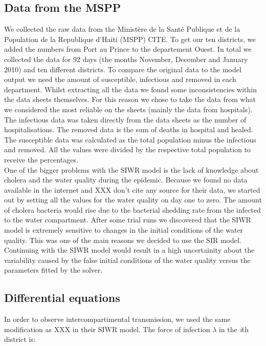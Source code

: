 \documentclass[11pt]{article}
\begin{document}
\subsection{Data from the MSPP}
We collected the raw data from the Ministère de la Santé Publique et de la Population de la Republique d'Haiti (MSPP) CITE. To get our ten districts, we added the numbers from Port au Prince to the departement Ouest. In total we collected the data for 92 days (the months November, December and January 2010) and ten different districts. To compare the original data to the model output we need the amount of susceptible, infectious and removed in each department. Whilst extracting all the data we found some inconsistencies within the data sheets themselves. For this reason we chose to take the data from what we considered the most reliable on the sheets (mainly the data from hospitals). The infectious data was taken directly from the data sheets as the number of hospitalisations. The removed data is the sum of deaths in hospital and healed. The susceptible data was calculated as the total population minus the infectious and removed. All the values were divided by the respective total population to receive the percentages.\\
One of the bigger problems with the SIWR model is the lack of knowledge about cholera and the water quality during the epidemic. Because we found no data available in the internet and XXX don't cite any source for their data, we started out by setting all the values for the water quality on day one to zero. The amount of cholera bacteria would rise due to the bacterial shedding rate from the infected to the water compartment. After some trial runs we discovered that the SIWR model is extremely sensitive to changes in the initial conditions of the water quality. This was one of the main reasons we decided to use the SIR model. Continuing with the SIWR model would result in a high uncertainity about the variability caused by the false initial conditions of the water quality versus the parameters fitted by the solver.






\subsection{Differential equations}
In order to observe intercompartimental transmission, we used the same modification as XXX in their SIWR model. The force of infection $\lambda$ in the \textit{i}th district is:
\end{document}
